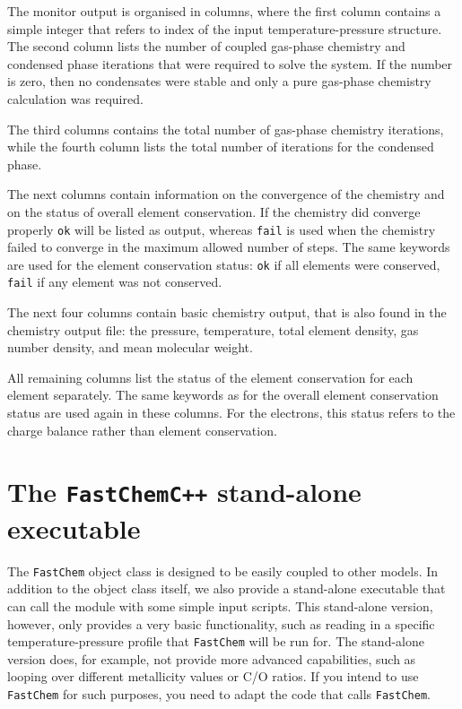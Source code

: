 \documentclass[numbers=noenddot]{aux/fcmanual}
\newcommand{\fc}{\texttt{FastChem}\xspace}
\newcommand{\cpp}{\ttt{C++}\xspace}
\newcommand{\ttt}[1]{\texttt {#1}}
\begin{document}
The monitor output is organised in columns, where the first column contains a simple integer that refers to index of the input temperature-pressure structure. The second column lists the number of coupled gas-phase chemistry and condensed phase iterations that were required to solve the system. If the number is zero, then no condensates were stable and only a pure gas-phase chemistry calculation was required.

The third columns contains the total number of gas-phase chemistry iterations, while the fourth column lists the total number of iterations for the condensed phase.

The next columns contain information on the convergence of the chemistry and on the status of overall element conservation. If the chemistry did converge properly \verb|ok| will be listed as output, whereas \verb|fail| is used when the chemistry failed to converge in the maximum allowed number of steps. The same keywords are used for the element conservation status: \verb|ok| if all elements were conserved, \verb|fail| if any element was not conserved. 

The next four columns contain basic chemistry output, that is also found in the chemistry output file: the pressure, temperature, total element density, gas number density, and mean molecular weight.

All remaining columns list the status of the element conservation for each element separately. The same keywords as for the overall element conservation status are used again in these columns. For the electrons, this status refers to the charge balance rather than element conservation.




\chapter{The \fc \cpp stand-alone executable}

The \fc object class is designed to be easily coupled to other models. In addition to the object class itself, we also provide a stand-alone executable that can call the module with some simple input scripts. This stand-alone version, however, only provides a very basic functionality, such as reading in a specific temperature-pressure profile that \fc will be run for. The stand-alone version does, for example, not provide more advanced capabilities, such as looping over different metallicity values or C/O ratios. If you intend to use \fc for such purposes, you need to adapt the code that calls \fc.
\end{document}
